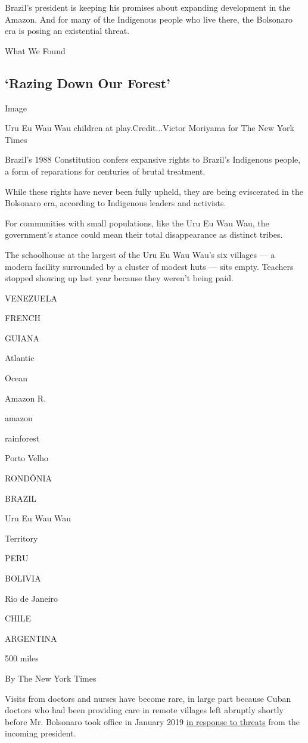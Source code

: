 Brazil's president is keeping his promises about expanding development
in the Amazon. And for many of the Indigenous people who live there, the
Bolsonaro era is posing an existential threat.

What We Found

\hypertarget{razing-down-our-forest}{%
\subsection{`Razing Down Our Forest'}\label{razing-down-our-forest}}

Image

Uru Eu Wau Wau children at play.Credit...Victor Moriyama for The New
York Times

Brazil's 1988 Constitution confers expansive rights to Brazil's
Indigenous people, a form of reparations for centuries of brutal
treatment.

While these rights have never been fully upheld, they are being
eviscerated in the Bolsonaro era, according to Indigenous leaders and
activists.

For communities with small populations, like the Uru Eu Wau Wau, the
government's stance could mean their total disappearance as distinct
tribes.

The schoolhouse at the largest of the Uru Eu Wau Wau's six villages ---
a modern facility surrounded by a cluster of modest huts --- sits empty.
Teachers stopped showing up last year because they weren't being paid.

VENEZUELA

FRENCH

GUIANA

Atlantic

Ocean

Amazon R.

amazon

rainforest

Porto Velho

RONDÔNIA

BRAZIL

Uru Eu Wau Wau

Territory

PERU

BOLIVIA

Rio de Janeiro

CHILE

ARGENTINA

500 miles

By The New York Times

Visits from doctors and nurses have become rare, in large part because
Cuban doctors who had been providing care in remote villages left
abruptly shortly before Mr. Bolsonaro took office in January 2019
\href{https://www.nytimes3xbfgragh.onion/2019/06/11/world/americas/brazil-cuba-doctors-jair-bolsonaro.html}{in
response to threats} from the incoming president.


